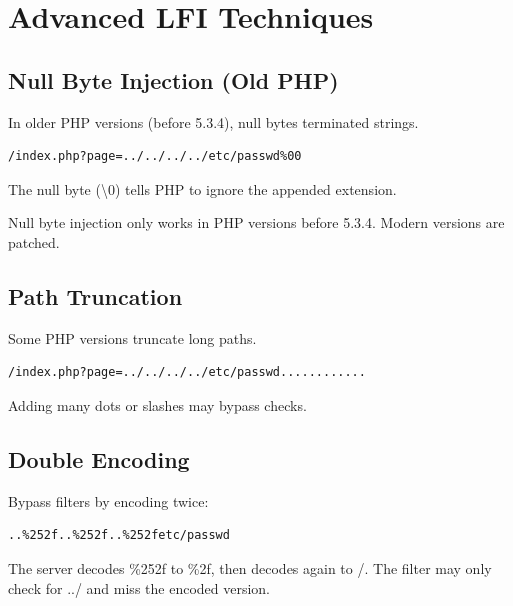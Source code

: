 \documentclass[12pt]{article}
\begin{document}
\section{Advanced LFI Techniques}

\subsection{Null Byte Injection (Old PHP)}

In older PHP versions (before 5.3.4), null bytes terminated strings.

\begin{lstlisting}
/index.php?page=../../../../etc/passwd%00
\end{lstlisting}

The null byte (\textbackslash 0) tells PHP to ignore the appended extension.

\begin{warningbox}
Null byte injection only works in PHP versions before 5.3.4. Modern versions are patched.
\end{warningbox}

\subsection{Path Truncation}

Some PHP versions truncate long paths.

\begin{lstlisting}
/index.php?page=../../../../etc/passwd............
\end{lstlisting}

Adding many dots or slashes may bypass checks.

\subsection{Double Encoding}

Bypass filters by encoding twice:

\begin{lstlisting}
..%252f..%252f..%252fetc/passwd
\end{lstlisting}

\begin{infobox}
The server decodes \%252f to \%2f, then decodes again to /. The filter may only check for ../ and miss the encoded version.
\end{infobox}
\end{document}
